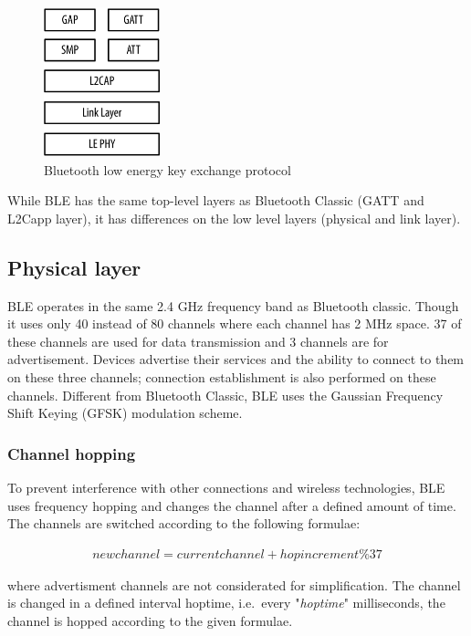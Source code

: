 \documentclass[conference]{IEEEtran}
\begin{document}
\begin{figure}
  \centering
    \includegraphics[width=0.3\textwidth]{layers}
    \caption{Bluetooth low energy key exchange protocol}
  \label{fig:layers}
\end{figure}


While BLE has the same top-level layers as Bluetooth Classic (GATT and L2Capp 
layer), it has differences on the low level layers (physical and link layer).

\subsection{Physical layer} \label{ssec:phy}

BLE operates in the same 2.4 GHz frequency band as Bluetooth classic. Though it 
uses only 40 instead of 80 channels where each channel has 2 MHz space. 37 of 
these channels are used for data transmission and 3 channels are for 
advertisement. Devices advertise their services and the ability to connect to 
them on these three channels; connection establishment is also performed on 
these channels. Different from Bluetooth Classic, BLE uses the Gaussian 
Frequency Shift Keying (GFSK) modulation scheme.

\subsubsection{Channel hopping}

To prevent interference with other connections and wireless technologies, BLE 
uses frequency hopping and changes the channel after a defined amount of time. 
The channels are switched according to the following formulae:

\begin{align*}
  newchannel = currentchannel+hopincrement \% 37
\end{align*}

where advertisment channels are not considerated for simplification. The channel is changed in a defined interval hoptime, i.e.\ every "\emph{hoptime}" milliseconds, the channel is hopped according to the given formulae.
\end{document}
